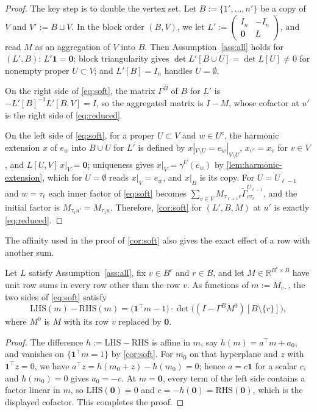 \documentclass[onefignum,onetabnum]{siamart250211}
\numberwithin{theorem}{section}
\numberwithin{equation}{section}
\newcommand{\R}{\mathbb{R}}
\newcommand{\one}{\mathbf{1}}
\newcommand{\zero}{\mathbf{0}}
\begin{document}
\begin{proof}
The key step is to double the vertex set. Let $B:=\{1',\dots,n'\}$ be a
copy of $V$ and $V':=B\sqcup V$. In the block order $(B,V)$, we let
$L':=\left(\begin{smallmatrix}I_n&-I_n\\ \zero&L\end{smallmatrix}\right)$,
and read $M$ as an aggregation of $V$ into $B$. Then Assumption~\ref{ass:all}
holds for $(L',B)$: $L'\one=\zero$; block triangularity gives
$\det L'[B\cup U]=\det L[U]\ne0$ for nonempty proper $U\subset V$; and
$L'[B]=I_n$ handles $U=\emptyset$. 

On the right side of \eqref{eq:soft},
the matrix $\Gamma^B$ of $B$ for $L'$ is $-L'[B]^{-1}L'[B,V]=I$, so the
aggregated matrix is $I-M$, whose cofactor at $u'$ is the right side of
\eqref{eq:reduced}. 

On the left side of \eqref{eq:soft}, for a proper $U\subset V$
and $w\in U^c$, the harmonic extension $x$ of $e_w$ into $B\cup U$ for
$L'$ is defined by $x|_{V\setminus U}=e_w|_{V\setminus U}$,
$x_{v'}=x_v$ for $v\in V$, and $L[U,V]\,x|_V=\zero$; uniqueness gives
$x|_V=\gamma^{U}(e_w)$ by \cref{lem:harmonic-extension}, which for
$U=\emptyset$ reads $x|_V=e_w$, and $x|_B$ is its copy. For $U=U_{\ell-1}$ and
$w=\tau_\ell$ each inner factor of \eqref{eq:soft} becomes
$\sum_{v\in V}M_{\tau_{\ell+1}v}\tilde\Gamma^{U_{\ell-1}}_{v\tau_\ell}$, and the
initial factor is $M_{\tau_1u'}=M_{\tau_1u}$. Therefore, \cref{cor:soft}
for $(L',B,M)$ at $u'$ is exactly \eqref{eq:reduced}.
\end{proof}

The affinity used in the proof of \cref{cor:soft} also gives the exact
effect of a row with another sum.

\begin{proposition}\label{prop:rowsum}
Let $L$ satisfy Assumption~\ref{ass:all}, fix $v\in B^c$ and $r\in B$, and let
$M\in\R^{B^c\times B}$ have unit row sums in every row other than the row
$v$. As functions of $m:=M_{v\cdot}$, the two sides of \eqref{eq:soft}
satisfy
\[
\mathrm{LHS}(m)-\mathrm{RHS}(m)=\big(\one^{\top}m-1\big)\cdot
\det\big((I-\Gamma^BM^{0})[B\setminus\{r\}]\big),
\]
where $M^{0}$ is $M$ with its row $v$ replaced by $\zero$.
\end{proposition}

\begin{proof}
The difference $h:=\mathrm{LHS}-\mathrm{RHS}$ is affine in $m$, say
$h(m)=a^{\top}m+a_0$, and vanishes on $\{\one^{\top}m=1\}$ by
\cref{cor:soft}. For $m_0$ on that hyperplane and $z$ with
$\one^{\top}z=0$, we have $a^{\top}z=h(m_0+z)-h(m_0)=0$; hence $a=c\one$
for a scalar $c$, and $h(m_0)=0$ gives $a_0=-c$. At $m=\zero$, every
term of the left side contains a factor linear in $m$, so
$\mathrm{LHS}(\zero)=0$ and $c=-h(\zero)=\mathrm{RHS}(\zero)$, which is
the displayed cofactor. This completes the proof.
\end{proof}
\end{document}
